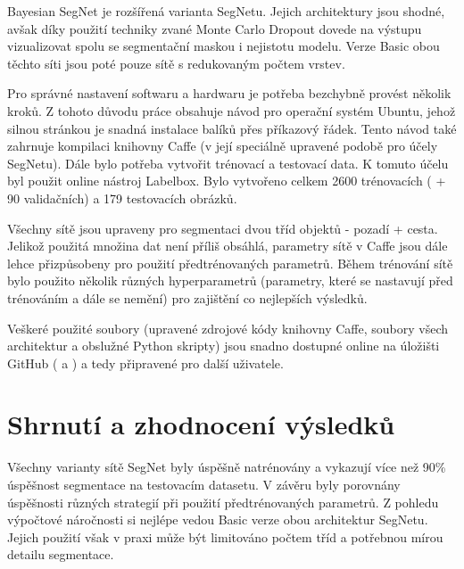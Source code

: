 Bayesian SegNet je rozšířená varianta SegNetu. Jejich architektury jsou shodné, avšak díky použití techniky zvané Monte Carlo Dropout dovede na výstupu vizualizovat spolu se segmentační maskou i nejistotu modelu. Verze Basic obou těchto síti jsou poté pouze sítě s redukovaným počtem vrstev. 

Pro správné nastavení softwaru a hardwaru je potřeba bezchybně provést několik kroků. Z tohoto důvodu práce obsahuje návod pro operační systém Ubuntu, jehož silnou stránkou je snadná instalace balíků přes příkazový řádek. Tento návod také zahrnuje kompilaci knihovny Caffe (v její speciálně upravené podobě pro účely SegNetu). Dále bylo potřeba vytvořit trénovací a testovací data. K tomuto účelu byl použit online nástroj Labelbox. Bylo vytvořeno celkem 2600 trénovacích ( + 90 validačních) a 179 testovacích obrázků.

Všechny sítě jsou upraveny pro segmentaci dvou tříd objektů - pozadí + cesta. Jelikož použitá množina dat není příliš obsáhlá, parametry sítě v Caffe jsou dále lehce přizpůsobeny pro použití předtrénovaných parametrů. Během trénování sítě bylo použito několik různých hyperparametrů (parametry, které se nastavují před trénováním a dále se nemění) pro zajištění co nejlepších výsledků.

Veškeré použité soubory (upravené zdrojové kódy knihovny Caffe, soubory všech architektur a obslužné Python skripty) jsou snadno dostupné online na úložišti GitHub (\cite{filip_github} a \cite{filip_github_caffe}) a tedy připravené pro další uživatele.

\section*{Shrnutí a zhodnocení výsledků}

Všechny varianty sítě SegNet byly úspěšně natrénovány a vykazují více než 90\% úspěšnost segmentace na testovacím datasetu. V závěru byly porovnány úspěšnosti různých strategií při použití předtrénovaných parametrů. Z pohledu výpočtové náročnosti si nejlépe vedou Basic verze obou architektur SegNetu. Jejich použití však v praxi může být limitováno počtem tříd a potřebnou mírou detailu segmentace.    

